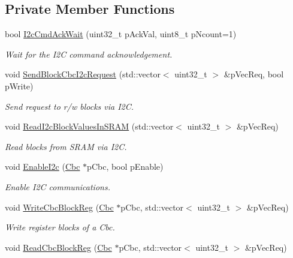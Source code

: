 \subsection*{Private Member Functions}
\begin{DoxyCompactItemize}
\item 
bool \hyperlink{class_ph2___hw_interface_1_1_cbc_interface_ad171e07d3777cebcdd1f65cc03915e7b}{I2c\-Cmd\-Ack\-Wait} (uint32\-\_\-t p\-Ack\-Val, uint8\-\_\-t p\-Ncount=1)
\begin{DoxyCompactList}\small\item\em Wait for the I2\-C command acknowledgement. \end{DoxyCompactList}\item 
void \hyperlink{class_ph2___hw_interface_1_1_cbc_interface_a89fb26e8441039ffa635ce189ab034be}{Send\-Block\-Cbc\-I2c\-Request} (std\-::vector$<$ uint32\-\_\-t $>$ \&p\-Vec\-Req, bool p\-Write)
\begin{DoxyCompactList}\small\item\em Send request to r/w blocks via I2\-C. \end{DoxyCompactList}\item 
void \hyperlink{class_ph2___hw_interface_1_1_cbc_interface_a5bffbf2ff373386ed92f8823ebe2cef3}{Read\-I2c\-Block\-Values\-In\-S\-R\-A\-M} (std\-::vector$<$ uint32\-\_\-t $>$ \&p\-Vec\-Req)
\begin{DoxyCompactList}\small\item\em Read blocks from S\-R\-A\-M via I2\-C. \end{DoxyCompactList}\item 
void \hyperlink{class_ph2___hw_interface_1_1_cbc_interface_a03c443239c9ee90a9d547fbcfed89df4}{Enable\-I2c} (\hyperlink{class_ph2___hw_description_1_1_cbc}{Cbc} $\ast$p\-Cbc, bool p\-Enable)
\begin{DoxyCompactList}\small\item\em Enable I2\-C communications. \end{DoxyCompactList}\item 
void \hyperlink{class_ph2___hw_interface_1_1_cbc_interface_a0829d7f94889de251860cae3f5f9d565}{Write\-Cbc\-Block\-Reg} (\hyperlink{class_ph2___hw_description_1_1_cbc}{Cbc} $\ast$p\-Cbc, std\-::vector$<$ uint32\-\_\-t $>$ \&p\-Vec\-Req)
\begin{DoxyCompactList}\small\item\em Write register blocks of a Cbc. \end{DoxyCompactList}\item 
void \hyperlink{class_ph2___hw_interface_1_1_cbc_interface_ac9ec0a962f0527a8298c1771240bf838}{Read\-Cbc\-Block\-Reg} (\hyperlink{class_ph2___hw_description_1_1_cbc}{Cbc} $\ast$p\-Cbc, std\-::vector$<$ uint32\-\_\-t $>$ \&p\-Vec\-Req)

\end{DoxyCompactItemize}
